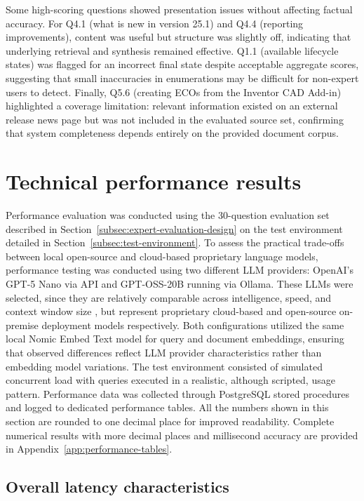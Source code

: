 Some high-scoring questions showed presentation issues without affecting factual accuracy. For Q4.1 (what is new in version 25.1) and Q4.4 (reporting improvements), content was useful but structure was slightly off, indicating that underlying retrieval and synthesis remained effective. Q1.1 (available lifecycle states) was flagged for an incorrect final state despite acceptable aggregate scores, suggesting that small inaccuracies in enumerations may be difficult for non-expert users to detect. Finally, Q5.6 (creating ECOs from the Inventor CAD Add-in) highlighted a coverage limitation: relevant information existed on an external release news page but was not included in the evaluated source set, confirming that system completeness depends entirely on the provided document corpus.

\section{Technical performance results}
\label{sec:technical-performance-results}

Performance evaluation was conducted using the 30-question evaluation set described in Section~\ref{subsec:expert-evaluation-design} on the test environment detailed in Section~\ref{subsec:test-environment}. To assess the practical trade-offs between local open-source and cloud-based proprietary language models, performance testing was conducted using two different LLM providers: OpenAI's GPT-5 Nano via API and GPT-OSS-20B running via Ollama. These LLMs were selected, since they are relatively comparable across intelligence, speed, and context window size \parencite{artificialanalysisGPT5NanoHigh}, but represent proprietary cloud-based and open-source on-premise deployment models respectively. Both configurations utilized the same local Nomic Embed Text model for query and document embeddings, ensuring that observed differences reflect LLM provider characteristics rather than embedding model variations. The test environment consisted of simulated concurrent load with queries executed in a realistic, although scripted, usage pattern. Performance data was collected through PostgreSQL stored procedures and logged to dedicated performance tables. All the numbers shown in this section are rounded to one decimal place for improved readability. Complete numerical results with more decimal places and millisecond accuracy are provided in Appendix~\ref{app:performance-tables}.

\subsection{Overall latency characteristics}
\label{subsec:latency-characteristics}

